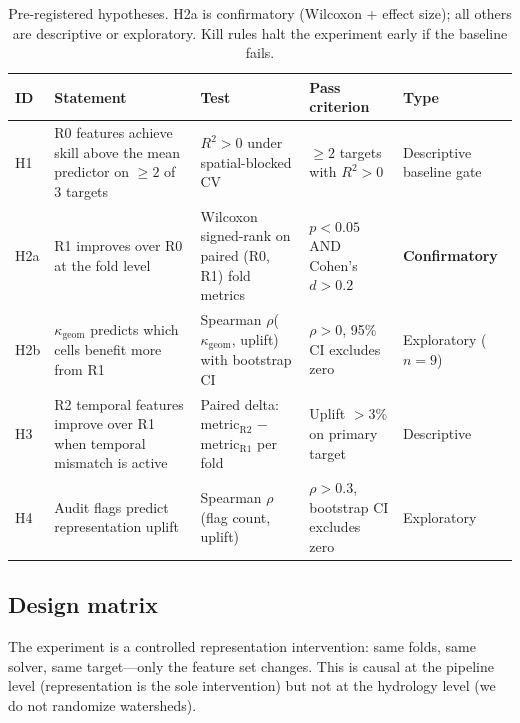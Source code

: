 \begin{table}[t]
\centering
\caption{Pre-registered hypotheses. H2a is confirmatory (Wilcoxon + effect
  size); all others are descriptive or exploratory. Kill rules halt the
  experiment early if the baseline fails.}
\label{app:tab:hypotheses}
\small
\begin{tabular}{@{}p{0.8cm}p{4.5cm}p{3.5cm}p{2.5cm}p{3.0cm}@{}}
\toprule
\textbf{ID} & \textbf{Statement} & \textbf{Test} & \textbf{Pass criterion} & \textbf{Type} \\
\midrule
H1 &
  R0 features achieve skill above the mean predictor on $\geq 2$ of 3 targets &
  $R^2 > 0$ under spatial-blocked CV &
  $\geq 2$ targets with $R^2 > 0$ &
  Descriptive baseline gate \\[4pt]
H2a &
  R1 improves over R0 at the fold level &
  Wilcoxon signed-rank on paired (R0, R1) fold metrics &
  $p < 0.05$ AND Cohen's $d > 0.2$ &
  \textbf{Confirmatory} \\[4pt]
H2b &
  $\kappa_\text{geom}$ predicts which cells benefit more from R1 &
  Spearman $\rho$($\kappa_\text{geom}$, uplift) with bootstrap CI &
  $\rho > 0$, 95\% CI excludes zero &
  Exploratory ($n{=}9$) \\[4pt]
H3 &
  R2 temporal features improve over R1 when temporal mismatch is active &
  Paired delta: metric$_\text{R2}$ $-$ metric$_\text{R1}$ per fold &
  Uplift $> 3\%$ on primary target &
  Descriptive \\[4pt]
H4 &
  Audit flags predict representation uplift &
  Spearman $\rho$(flag count, uplift) &
  $\rho > 0.3$, bootstrap CI excludes zero &
  Exploratory \\
\bottomrule
\end{tabular}
\end{table}

\subsection{Design matrix}
\label{app:doe-design}

The experiment is a controlled representation intervention: same folds,
same solver, same target---only the feature set changes. This is causal
at the pipeline level (representation is the sole intervention) but not
at the hydrology level (we do not randomize watersheds).

